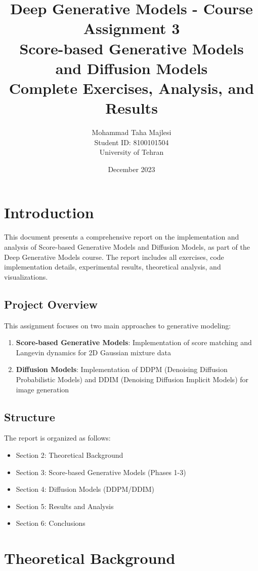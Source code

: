 \documentclass[12pt,a4paper]{article}
\title{Deep Generative Models - Course Assignment 3\\
\large Score-based Generative Models and Diffusion Models\\
\large Complete Exercises, Analysis, and Results}
\author{Mohammad Taha Majlesi\\Student ID: 8100101504\\University of Tehran}
\date{December 2023}
\begin{document}
\maketitle

\tableofcontents
\newpage

\section{Introduction}

This document presents a comprehensive report on the implementation and analysis of Score-based Generative Models and Diffusion Models, as part of the Deep Generative Models course. The report includes all exercises, code implementation details, experimental results, theoretical analysis, and visualizations.

\subsection{Project Overview}

This assignment focuses on two main approaches to generative modeling:

\begin{enumerate}
    \item \textbf{Score-based Generative Models}: Implementation of score matching and Langevin dynamics for 2D Gaussian mixture data
    \item \textbf{Diffusion Models}: Implementation of DDPM (Denoising Diffusion Probabilistic Models) and DDIM (Denoising Diffusion Implicit Models) for image generation
\end{enumerate}

\subsection{Structure}

The report is organized as follows:
\begin{itemize}
    \item Section 2: Theoretical Background
    \item Section 3: Score-based Generative Models (Phases 1-3)
    \item Section 4: Diffusion Models (DDPM/DDIM)
    \item Section 5: Results and Analysis
    \item Section 6: Conclusions
\end{itemize}

\section{Theoretical Background}
\end{document}
